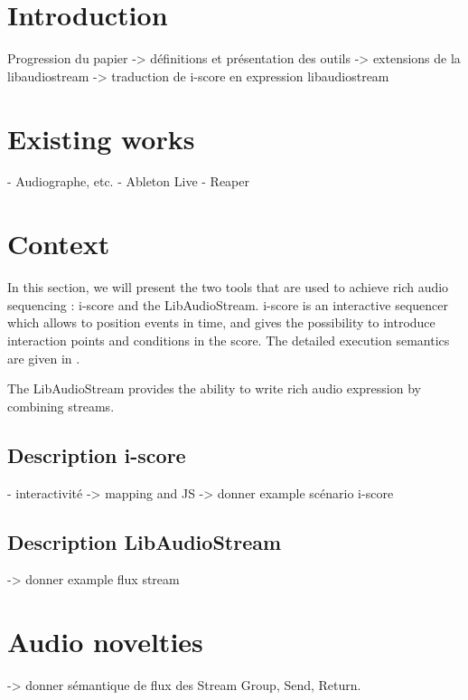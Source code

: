 \documentclass{article}
\title{\papertitle}
\begin{document}
%
\capstartfalse
\maketitle
\capstarttrue
%
\begin{abstract}
Place your abstract at the top left column on the first page.
Please write about 150--200 words that specifically highlight the purpose of your work,
its context, and provide a brief synopsis of your results.
Avoid equations in this part.
\end{abstract}
\section{Introduction}

Progression du papier
-> définitions et présentation des outils
-> extensions de la libaudiostream
-> traduction de i-score en expression libaudiostream
\section{Existing works}
- Audiographe, etc.
- Ableton Live
- Reaper

\section{Context}
In this section, we will present the two tools that are used to achieve 
rich audio sequencing : i-score and the LibAudioStream.
i-score is an interactive sequencer which allows to position events 
in time, and gives the possibility to introduce interaction points and 
conditions in the score.
The detailed execution semantics are given in \cite{celerier2015ossia}.

The LibAudioStream provides the ability to write rich audio expression
by combining streams.

\subsection{Description i-score}
- interactivité
-> mapping and JS
-> donner example scénario i-score


\subsection{Description LibAudioStream}
-> donner example flux stream

\section{Audio novelties}
-> donner sémantique de flux des Stream Group, Send, Return.
\end{document}
